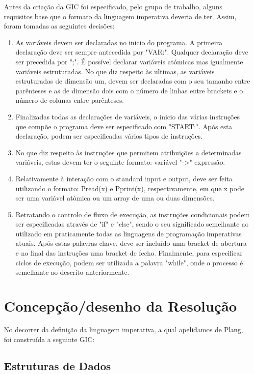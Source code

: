 \documentclass{report}
\begin{document}
Antes da criação da GIC foi especificado, pelo grupo de trabalho, alguns requisitos base que o formato da linguagem imperativa deveria de ter. Assim, foram tomadas as seguintes decisões: 
\begin{enumerate}
\item As variáveis devem ser declaradas no inicio do programa. A primeira declaração deve ser sempre antecedida por "VAR:". Qualquer declaração deve ser precedida por ";". É possível declarar variáveis atómicas mas igualmente variáveis estruturadas. No que diz respeito às ultimas, as variáveis estruturadas de dimensão um, devem ser declaradas com o seu tamanho entre parênteses e as de dimensão dois com o número de linhas entre brackets e o número de colunas entre parênteses.
\item Finalizadas todas as declarações de variáveis, o inicio das várias instruções que compõe o programa deve ser especificado com "START:". Após esta declaração, podem ser especificadas vários  tipos de instruções. 
\item No que diz respeito às instruções que permitem atribuições a determinadas variáveis, estas devem ter o seguinte formato: variável "->" expressão.  
\item Relativamente à interação com o standard input e output, deve ser feita utilizando o formato: Pread(x) e Pprint(x), respectivamente, em que x pode ser uma variável atómica ou um array de uma ou duas dimensões. 
\item Retratando o controlo de fluxo de execução, as instruções condicionais podem ser especificadas através de "if" e "else", sendo o seu significado semelhante ao utilizado em praticamente todas as linguagens de programação imperativas atuais. Após estas palavras chave, deve ser incluído uma bracket de abertura e no final das instruções uma bracket de fecho. Finalmente, para especificar ciclos de execução, podem ser utilizada a palavra "while", onde o processo é semelhante ao descrito anteriormente.  
\end{enumerate}

\chapter{Concepção/desenho da Resolução} \label{cd}

No decorrer da definição da linguagem imperativa, a qual apelidamos de Plang, foi construída a seguinte GIC: 



\section{Estruturas de Dados}
\end{document}
